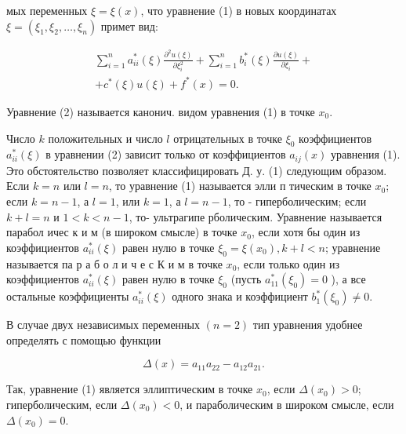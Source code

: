 \documentclass[10pt]{article}
\begin{document}
мых переменных $\xi=\xi(x)$, что уравнение (1) в новых координатах $\xi=\left(\xi_{1}, \xi_{2}, \ldots, \xi_{n}\right)$ примет вид:



\[

\begin{gathered}

\sum_{i=1}^{n} a_{i i}^{*}(\xi) \frac{\partial^{2} u(\xi)}{\partial \xi_{i}^{2}}+\sum_{i=1}^{n} b_{i}^{*}(\xi) \frac{\partial u(\xi)}{\partial \xi_{i}}+ \\

+c^{*}(\xi) u(\xi)+f^{*}(x)=0 .

\end{gathered}

\]



Уравнение (2) называется канонич. видом уравнения (1) в точке $x_{0}$.



Число $k$ положительных и число $l$ отрицательных в точке $\xi_{0}$ коэффициентов $a_{i i}^{*}(\xi)$ в уравнении (2) зависит только от коэффициентов $a_{i j}(x)$ уравнения (1). Это обстоятельство позволяет классифицировать Д. у. (1) следующим образом. Если $k=n$ или $l=n$, то уравнение (1) называется элли п тическим в точке $x_{0}$; если $k=n-1$, а $l=1$, или $k=1$, а $l=n-1$, то - гиперболическим; если $k+l=n$ и $1<k<n-1$, то- ультрагипе рболическим. Уравнение называется парабол ичес к и м (в широком смысле) в точке $x_{0}$, если хотя бы один из коэффициентов $a_{i i}^{*}(\xi)$ равен нулю в точке $\xi_{0}=\xi\left(x_{0}\right), k+l<n$; уравнение называется па р а б о л и ч е с К и м в точке $x_{0}$, если только один из коэффициентов $a_{i i}^{*}(\xi)$ равен нулю в точке $\xi_{0}$ (пусть $a_{11}^{*}\left(\xi_{0}\right)=0$ ), а все остальные коэффициенты $a_{i i}^{*}(\xi)$ одного знака и коэффициент $b_{1}^{*}\left(\xi_{0}\right) \neq 0$.



В случае двух независимых переменных $(n=2)$ тип уравнения удобнее определять с помощью функции



\[

\Delta(x)=a_{11} a_{22}-a_{12} a_{21} .

\]



Так, уравнение (1) является эллиптическим в точке $x_{0}$, если $\Delta\left(x_{0}\right)>0$; гиперболическим, если $\Delta\left(x_{0}\right)<0$, и параболическим в широком смысле, если $\Delta\left(x_{0}\right)=0$.
\end{document}
